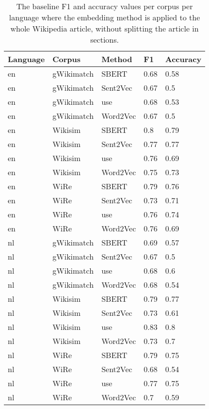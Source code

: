 \begin{table}[!ht]
    \centering
    \captionsetup{justification=centering}
    \begin{tabular}{l|l|l|l|l}
    \hline
        \textbf{Language} & \textbf{Corpus} & \textbf{Method} & \textbf{F1} & \textbf{Accuracy} \\ \hline
        en & gWikimatch & SBERT    & 0.68 & 0.58 \\ \hline
en & gWikimatch & Sent2Vec & 0.67 & 0.5  \\ \hline
en & gWikimatch & use      & 0.68 & 0.53 \\ \hline
en & gWikimatch & Word2Vec & 0.67 & 0.5  \\ \hline
en & Wikisim    & SBERT    & 0.8  & 0.79 \\ \hline
en & Wikisim    & Sent2Vec & 0.77 & 0.77 \\ \hline
en & Wikisim    & use      & 0.76 & 0.69 \\ \hline
en & Wikisim    & Word2Vec & 0.75 & 0.73 \\ \hline
en & WiRe       & SBERT    & 0.79 & 0.76 \\ \hline
en & WiRe       & Sent2Vec & 0.73 & 0.71 \\ \hline
en & WiRe       & use      & 0.76 & 0.74 \\ \hline
en & WiRe       & Word2Vec & 0.76 & 0.69 \\ \hline
nl & gWikimatch & SBERT    & 0.69 & 0.57 \\ \hline
nl & gWikimatch & Sent2Vec & 0.67 & 0.5  \\ \hline
nl & gWikimatch & use      & 0.68 & 0.6  \\ \hline
nl & gWikimatch & Word2Vec & 0.68 & 0.54 \\ \hline
nl & Wikisim    & SBERT    & 0.79 & 0.77 \\ \hline
nl & Wikisim    & Sent2Vec & 0.73 & 0.61 \\ \hline
nl & Wikisim    & use      & 0.83 & 0.8  \\ \hline
nl & Wikisim    & Word2Vec & 0.73 & 0.7  \\ \hline
nl & WiRe       & SBERT    & 0.79 & 0.75 \\ \hline
nl & WiRe       & Sent2Vec & 0.68 & 0.54 \\ \hline
nl & WiRe       & use      & 0.77 & 0.75 \\ \hline
nl & WiRe       & Word2Vec & 0.7  & 0.59 \\ \hline

    \end{tabular}
    \caption{The baseline F1 and accuracy values per corpus per language where the embedding method is applied to the whole Wikipedia article, without splitting the article in sections.}
    \label{tabWholeDocument}
\end{table}

